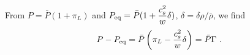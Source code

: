 \documentclass[11pt,a4paper]{article}
\begin{document}
From $P = \bar{P} (1 + \pi_L)$ and $P_{\rm eq} = \bar{P} (1 + \dfrac{c_s^2}{w} \delta)$, $\delta = \delta \rho/\bar{\rho}$, we find
\begin{equation}
P- P_{\rm eq} = \bar{P} \left( \pi_L - \dfrac{c_s^2}{w} \delta \right) = \bar{P} \Gamma ~.
\end{equation}
































\end{document}
